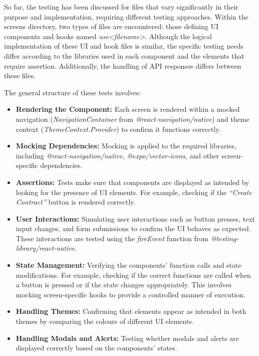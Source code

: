 So far, the testing has been discussed for files that vary significantly in their purpose and implementation, requiring different testing approaches. Within the screens directory, two types of files are encountered: those defining UI components and hooks named \textit{use<filename>}. Although the logical implementation of these UI and hook files is similar, the specific testing needs differ according to the libraries used in each component and the elements that require assertion. Additionally, the handling of API responses differs between these files.

The general structure of these tests involves:

\begin{itemize}
    \item \textbf{Rendering the Component:} Each screen is rendered within a mocked navigation (\textit{NavigationContainer} from \textit{@react-navigation/native}) and theme context (\textit{ThemeContext.Provider}) to confirm it functions correctly.
    \item \textbf{Mocking Dependencies:} Mocking is applied to the required libraries, including \textit{@react-navigation/native}, \textit{@expo/vector-icons}, and other screen-specific dependencies.
    \item \textbf{Assertions:} Tests make sure that components are displayed as intended by looking for the presence of UI elements. For example, checking if the \textit{``Create Contract''} button is rendered correctly.
    \item \textbf{User Interactions:} Simulating user interactions such as button presses, text input changes, and form submissions to confirm the UI behaves as expected. These interactions are tested using the \textit{fireEvent} function from \textit{@testing-library/react-native}.
    \item \textbf{State Management:} Verifying the components' function calls and state modifications. For example, checking if the correct functions are called when a button is pressed or if the state changes appropriately. This involves mocking screen-specific hooks to provide a controlled manner of execution.
    \item \textbf{Handling Themes:} Confirming that elements appear as intended in both themes by comparing the colours of different UI elements.
    \item \textbf{Handling Modals and Alerts:} Testing whether modals and alerts are displayed correctly based on the components' states.
\end{itemize}

